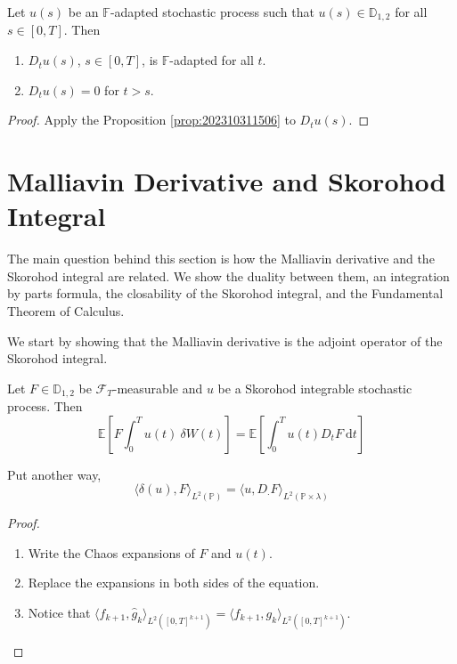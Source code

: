 \begin{corollary}\label{cor:202311071657}
	Let $u(s)$ be an $\mathbb{F}$-adapted stochastic process such that $u(s) \in \mathbb{D}_{1,2}$ for all $s \in [0,T]$. Then 
	\begin{enumerate}
	\item $D_t u(s)$, $s \in [0,T]$, is $\mathbb{F}$-adapted for all $t$. 
	\item $D_t u(s) = 0$ for $t > s$.
	\end{enumerate}
\end{corollary}

\begin{proof}
	Apply the Proposition \ref{prop:202310311506} to $D_t u(s)$.
\end{proof}

\section{Malliavin Derivative and Skorohod Integral} 

The main question behind this section is how the Malliavin derivative and the Skorohod integral are related. We show the duality between them, an integration by parts formula, the closability of the Skorohod integral, and the Fundamental Theorem of Calculus. 

We start by showing that the Malliavin derivative is the adjoint operator of the Skorohod integral.

\begin{theorem}\label{thm:duality_formula}
	Let $F \in \mathbb{D}_{1,2}$ be $\mathcal{F}_T$-measurable and $u$ be a Skorohod integrable stochastic process. Then 
	\begin{equation*}
		\mathbb{E} \left[ F \int_0^T u(t) ~\delta W(t) \right] = \mathbb{E} \left[ \int_0^T u(t) D_t F ~\mathrm{d}t \right]
	\end{equation*}

	Put another way, 
	$$
	\langle \delta(u), F \rangle_{L^2(\mathbb{P})} = \langle u, D_{\cdot} F \rangle_{L^2(\mathbb{P} \times \lambda)}
	$$
\end{theorem}

\begin{proof}
	\begin{enumerate}
	\item Write the Chaos expansions of $F$ and $u(t)$.
	\item Replace the expansions in both sides of the equation.
	\item Notice that $\langle f_{k+1}, \hat{g}_k \rangle_{L^2([0,T]^{k+1})} = \langle f_{k+1}, g_k \rangle_{L^2([0,T]^{k+1})}$.
	\end{enumerate}
\end{proof}

